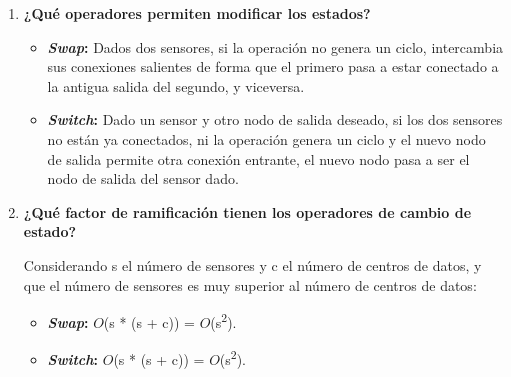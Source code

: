 \documentclass{article}
\begin{document}
\begin{enumerate}
  \item \textbf{¿Qué operadores permiten modificar los estados?}
  \begin{itemize}
      \item \textbf{\textit{Swap}:} Dados dos sensores, si la operación no genera un ciclo, intercambia sus conexiones salientes de forma que el primero pasa a estar conectado a la antigua salida del segundo, y viceversa.
      \item \textbf{\textit{Switch}:} Dado un sensor y otro nodo de salida deseado, si los dos sensores no están ya conectados, ni la operación genera un ciclo y el nuevo nodo de salida permite otra conexión entrante, el nuevo nodo pasa a ser el nodo de salida del sensor dado.
  \end{itemize}
  \item \textbf{¿Qué factor de ramificación tienen los operadores de cambio de estado?}\par
  Considerando s el número de sensores y c el número de centros de datos, y que el número de sensores es muy superior al número de centros de datos:
  \begin{itemize}
      \item \textbf{\textit{Swap}:} $O$(s * (s + c)) = $O$(s\textsuperscript{2}).
      \item \textbf{\textit{Switch}:} $O$(s * (s + c)) = $O$(s\textsuperscript{2}).
  \end{itemize}
\end{enumerate}
\end{document}
